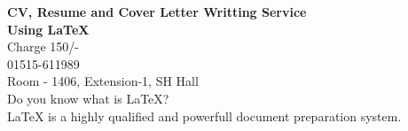 \documentclass{article}
\begin{document}
\vspace*{\fill}
\begin{center}
 \LARGE{\textbf{CV, Resume and Cover Letter Writting Service \\Using \LaTeX{}}}
\\
\vspace{2cm}
\Large{Charge 150/-}\\
 \faPhone{} 01515-611989\\
  \faHome{} Room - 1406, Extension-1, SH Hall
\\
\vspace{2cm}
Do you know what is \LaTeX{}?\\
\LaTeX{} is a highly qualified and powerfull document preparation system.
\end{center}
\vspace*{\fill}
 
\end{document}
